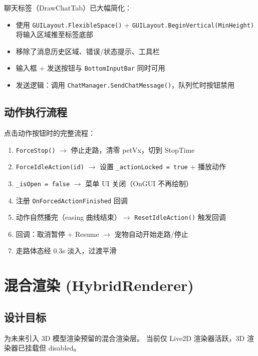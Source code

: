 \documentclass[12pt,a4paper]{ctexart}
\begin{document}
聊天标签（DrawChatTab）已大幅简化：

\begin{itemize}
    \item 使用 \texttt{GUILayout.FlexibleSpace()} + \texttt{GUILayout.BeginVertical(MinHeight)} 
          将输入区域推至标签底部
    \item 移除了消息历史区域、错误/状态提示、工具栏
    \item 输入框 + 发送按钮与 \texttt{BottomInputBar} 同时可用
    \item 发送逻辑：调用 \texttt{ChatManager.SendChatMessage()}，队列忙时按钮禁用
\end{itemize}

\subsection{动作执行流程}

点击动作按钮时的完整流程：

\begin{enumerate}
    \item \texttt{ForceStop()} $\to$ 停止走路，清零 petVx，切到 StopTime
    \item \texttt{ForceIdleAction(id)} $\to$ 设置 \texttt{\_actionLocked = true} + 播放动作
    \item \texttt{\_isOpen = false} $\to$ 菜单 UI 关闭（OnGUI 不再绘制）
    \item 注册 \texttt{OnForcedActionFinished} 回调
    \item 动作自然播完（easing 曲线结束）$\to$ \texttt{ResetIdleAction()} 触发回调
    \item 回调：取消暂停 + Resume $\to$ 宠物自动开始走路/停止
    \item 走路体态经 0.3s 淡入，过渡平滑
\end{enumerate}

\section{混合渲染 (HybridRenderer)}

\subsection{设计目标}

为未来引入 3D 模型渲染预留的混合渲染层。
当前仅 Live2D 渲染器活跃，3D 渲染器已挂载但 disabled。
\end{document}
